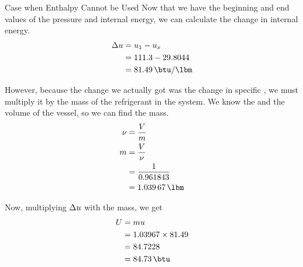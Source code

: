 \begin{example}{Case when Enthalpy Cannot be Used}
  Now that we have the beginning and end values of the pressure and internal energy, we can calculate the change in internal energy.
  \begin{align*}
    \Change{\SpecificInternalEnergy} &= \SpecificInternalEnergy_{1} - \SpecificInternalEnergy_{x} \\
                             &= 111.3 - 29.8044 \\
                             &= \SI{81.49}{\btu\per\lbm}
  \end{align*}

  However, because the change we actually got was the change in specific , we must multiply it by the mass of the refrigerant in the system.
  We know the  and the volume of the vessel, so we can find the mass.
  \begin{align*}
    \SpecificVolume &= \frac{\Volume}{\Mass} \\
    \Mass &= \frac{\Volume}{\SpecificVolume} \\
                    &= \frac{1}{0.961843} \\
    &= \SI{1.03967}{\lbm}
  \end{align*}

  Now, multiplying $\Delta u$ with the mass, we get
  \begin{align*}
    \InternalEnergy &= \Mass \SpecificInternalEnergy \\
                    &= 1.03967 \times 81.49 \\
                    &= 84.7228 \\
                    &= \SI{84.73}{\btu}
  \end{align*}
\end{example}

